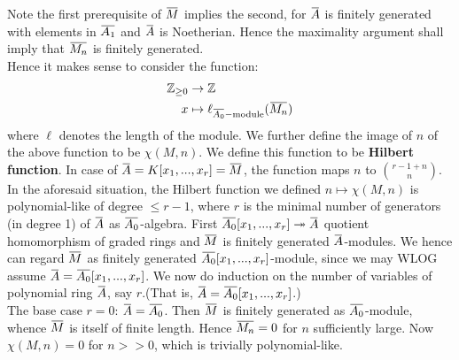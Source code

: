 \documentclass[12pt]{article}
\theoremstyle{definition}
\theoremstyle{plain}
\newcommand{\z}{\mathbb{Z}}
\newcommand{\surj}{\twoheadrightarrow}
\newcommand{\overbar}[1]{\mkern 1.5mu\overline{\mkern-1.5mu#1\mkern-1.5mu}\mkern 1.5mu}
\renewcommand{\bar}{\overbar}
\begin{document}
Note the first prerequisite of $\bar{M}$ implies the second, for $\bar{A}$ is finitely generated with elements in $\bar{A_1}$ and $\bar{A}$ is Noetherian. Hence the maximality argument shall imply that $\bar{M_n}$ is finitely generated.\\
\indent Hence it makes sense to consider the function:
\begin{align*}
  \z_{\geq 0}&\to \z\\
  x&\mapsto \ell_{\bar{A_0}-\text{module}}(\bar{M_n})
\end{align*}
where $\ell$ denotes the length of the module. We further define the image of $n$ of the above function to be $\chi(M, n)$. We define this function to be \textbf{Hilbert function}.
\Exe In case of $\bar{A}=K[x_1, ..., x_r]=\bar{M}$, the function maps $n$ to $\binom{r-1+n}{n}$.
 In the aforesaid situation, the Hilbert function we defined $n\mapsto \chi(M,n)$ is polynomial-like of degree $\leq r-1$, where $r$ is the minimal number of generators (in degree 1) of $\bar{A}$ as $\bar{A_0}$-algebra.
\proof First $\bar{A_0}[x_1, ..., x_r]\surj \bar{A}$ quotient homomorphism of graded rings and $\bar{M}$ is finitely generated $\bar{A}$-modules. We hence can regard $\bar{M}$ as finitely generated $\bar{A_0}[x_1, ..., x_r]$-module, since we may WLOG assume $\bar{A}=\bar{A_0}[x_1, ..., x_r]$. We now do induction on the number of variables of polynomial ring $\bar{A}$, say $r$.(That is, $\bar{A}=\bar{A_0}[x_1, ..., x_r]$.)\\
The base case $r=0$: $\bar{A}=\bar{A_0}$. Then $\bar{M}$ is finitely generated as $\bar{A_0}$-module, whence $\bar{M}$ is itself of finite length. Hence $\bar{M_n}=0$ for $n$ sufficiently large. Now $\chi(M, n)=0$ for $n>>0$, which is trivially polynomial-like.
\end{document}
